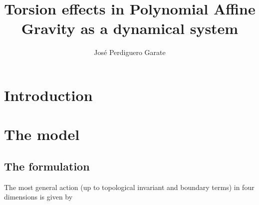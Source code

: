 \documentclass{article}
\title{Torsion effects in Polynomial Affine Gravity as a dynamical system}
\author{Jos\'e Perdiguero Garate}
\begin{document}
\maketitle

\section{Introduction}

\section{The model}




\subsection{The formulation}
The most general action (up to topological invariant and boundary terms) in four dimensions is given by
\end{document}
